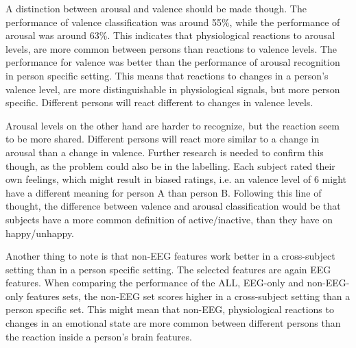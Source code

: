 \npar 

A distinction between arousal and valence should be made though. The performance of valence classification was around 55\%, while the performance of arousal was around 63\%. This indicates that physiological reactions to arousal levels, are more common between persons than reactions to valence levels. The performance for valence was better than the performance of arousal recognition in person specific setting. This means that reactions to changes in a person's valence level, are more distinguishable in physiological signals, but more person specific. Different persons will react different to changes in valence levels.

\npar

Arousal levels on the other hand are harder to recognize, but the reaction seem to be more shared. Different persons will react more similar to a change in arousal than a change in valence. Further research is needed to confirm this though, as the problem could also be in the labelling. Each subject rated their own feelings, which might result in biased ratings, i.e. an valence level of 6 might have a different meaning for person A than person B. Following this line of thought, the difference between valence and arousal classification would be that subjects have a more common definition of active/inactive, than they have on happy/unhappy.

\npar

Another thing to note is that non-EEG features work better in a cross-subject setting than in a person specific setting. The selected features are again EEG features. When comparing the performance of the ALL, EEG-only and non-EEG-only features sets, the non-EEG set scores higher in a cross-subject setting than a person specific set. This might mean that non-EEG, physiological reactions to changes in an emotional state are more common between different persons than the reaction inside a person's brain features.